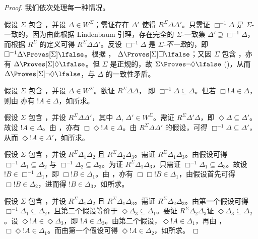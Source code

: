 \documentclass[../../../include/open-logic-section]{subfiles}
\begin{document}
\begin{proof}
  我们依次处理每一种情况。

  假设 $\Sigma$ 包含 ，并设 $\Delta \in W^\Sigma$；需证存在 $\Delta'$ 使得 $R^\Sigma
  \Delta\Delta'$。只需证 $\Box^{-1}\Delta$ 是 $\Sigma$-一致的，因为由此根据 Lindenbaum 引理，存在完全的 $\Sigma$-一致集 $\Delta' \supseteq
  \Box^{-1}\Delta$，而根据 $R^\Sigma$ 的定义可得
  $R^\Sigma \Delta\Delta'$。反设 $\Box^{-1}\Delta$ 是 $\Sigma$-\emph{不一致}的，即
  $\Box^{-1}\Delta \Proves[\Sigma] \lfalse$。根据 ，
  $\Delta \Proves[\Sigma] \Box\lfalse$；又因 $\Sigma$ 包含
  ，亦有 $\Delta \Proves[\Sigma] \Diamond\lfalse$。但 $\Sigma$
  是正规的，故 $\Sigma \Proves \lnot\Diamond \lfalse$
  ()，从而 $\Delta
  \Proves[\Sigma] \lnot\Diamond \lfalse$，与 $\Delta$ 的一致性矛盾。

  假设 $\Sigma$ 包含 ，并设 $\Delta \in
  W^\Sigma$。欲证 $R^\Sigma \Delta\Delta$，
  即
  $\Box^{-1}\Delta \subseteq \Delta$。但若 $\Box!A \in \Delta$，则由  亦有 $!A \in \Delta$，如所求。

  假设 $\Sigma$ 包含 ，并设 $R^\Sigma
  \Delta\Delta'$，其中 $\Delta$, $\Delta' \in W^\Sigma$。需证
  $R^\Sigma \Delta'\Delta$，即
  $\Diamond\Delta \subseteq \Delta'$。故设 $!A \in \Delta$。由
  ，亦有 $\Box\Diamond!A \in \Delta$。由 $R^\Sigma \Delta\Delta'$ 的假设，可得 $\Box^{-1}\Delta
  \subseteq \Delta'$，从而 $\Diamond!A \in \Delta'$，如所求。

  假设 $\Sigma$ 包含 ，并设 $R^\Sigma
  \Delta_1\Delta_2$ 且 $R^\Sigma \Delta_2\Delta_3$。需证
  $R^\Sigma \Delta_1\Delta_3$。由假设可得 $\Box^{-1}\Delta_1
  \subseteq \Delta_2$ 与 $\Box^{-1}\Delta_2 \subseteq \Delta_3$。为证 $R^\Sigma \Delta_1\Delta_3$，只需证
  $\Box^{-1}\Delta_1 \subseteq \Delta_3$。故设 $!B \in
  \Box^{-1}\Delta_1$，即 $\Box!B \in \Delta_1$。由 ，亦有
  $\Box\Box!B \in \Delta_1$，由假设首先可得 $\Box!B \in \Delta_2$，进而得 $!B \in \Delta_3$，如所求。

  假设 $\Sigma$ 包含 ，并设 $R^\Sigma
  \Delta_1\Delta_2$ 且 $R^\Sigma \Delta_1\Delta_3$。需证
  $R^\Sigma \Delta_2\Delta_3$。由第一个假设可得 $\Box^{-1}\Delta_1 \subseteq \Delta_2$，且第二个假设等价于 $\Diamond\Delta_3 \subseteq \Delta_1$。要证 $R^\Sigma
  \Delta_2\Delta_3$证 $\Diamond\Delta_3 \subseteq \Delta_2$。设 $\Diamond!A \in
  \Diamond\Delta_3$，即 $!A \in \Delta_3$。由第二个假设，$\Diamond!A \in \Delta_1$，再由 ，$\Box\Diamond!A \in
  \Delta_1$。而由第一个假设可得 $\Diamond!A \in \Delta_2$，如所求。
  \end{proof}
\end{document}
